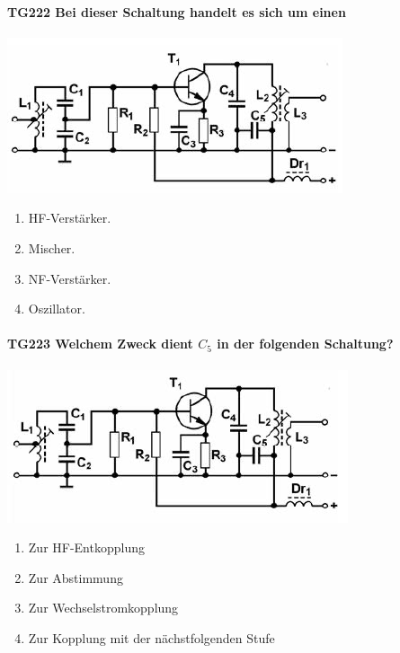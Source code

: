 \documentclass[8pt]{article}
\begin{document}
\paragraph*{TG222 Bei dieser Schaltung handelt es sich um einen}
\begin{center}
	\begin{minipage}{\linewidth}
		\centering
		\includegraphics[scale=1.0]{pics/tg222_a.jpg}
	\end{minipage}
\end{center}
\begin{enumerate}[nolistsep,label=\Alph*]
\item HF-Verstärker.
\item Mischer.
\item NF-Verstärker.
\item Oszillator.
\end{enumerate}

\paragraph*{TG223 Welchem Zweck dient $C_{5}$ in der folgenden Schaltung?}
\begin{center}
	\begin{minipage}{\linewidth}
		\centering
		\includegraphics[scale=1.0]{pics/tg223_a.jpg}
	\end{minipage}
\end{center}
\begin{enumerate}[nolistsep,label=\Alph*]
\item Zur HF-Entkopplung
\item Zur Abstimmung
\item Zur Wechselstromkopplung
\item Zur Kopplung mit der nächstfolgenden Stufe
\end{enumerate}
\end{document}
